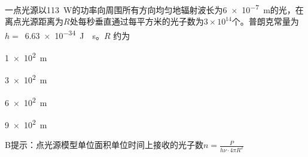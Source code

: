 一点光源以\qty{113}{W}的功率向周围所有方向均匀地辐射波长为\qty{6e-7}{m}的光，在离点光源距离为\(R\)处每秒垂直通过每平方米的光子数为\(3\times 10^{14}\)个。普朗克常量为\(h =\) \,\qty{6.63e-34}{J\cdot s}。\(R\) 约为\paren[B]
\begin{choices}
	\item \qty{1e2}{m}
	\item \qty{3e2}{m}
	\item \qty{6e2}{m}
	\item \qty{9e2}{m}
\end{choices}
\begin{answer}
	B\qquad 提示：点光源模型单位面积单位时间上接收的光子数\(n = \frac{P}{h\nu\cdot 4\pi R^2}\)
\end{answer}